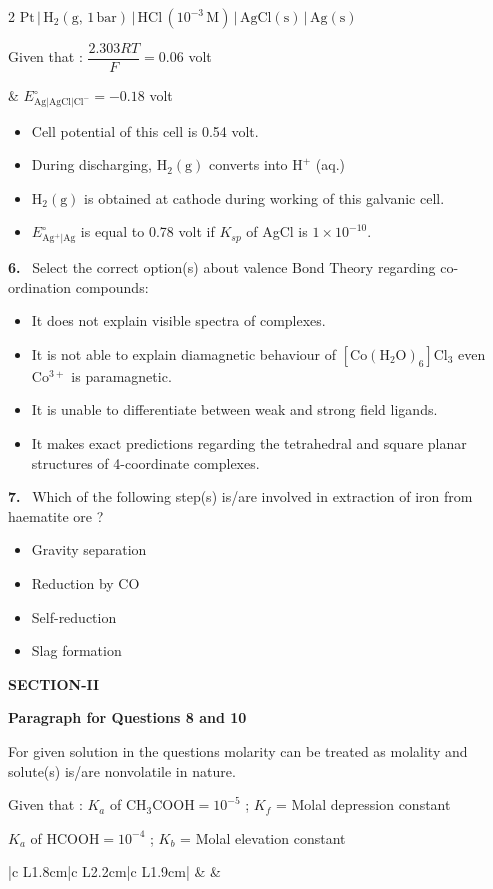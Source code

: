 \documentclass[10pt]{extarticle}
\newcommand{\sect}[1]{\par\smallskip\noindent\textbf{#1}\par}
\newcommand{\qn}[1]{\par\smallskip\noindent\textbf{#1.}~}
\newcommand{\paraq}[2]{\par\smallskip\noindent\textbf{Paragraph for Questions #1 and #2}\par}
\newenvironment{qoptions}{\begin{itemize}[leftmargin=1.8em,itemsep=1pt,topsep=2pt,label={}]}{\end{itemize}}
\newcommand{\opt}[2]{\item[(#1)] #2}
\begin{document}
\begin{multicols}{2}
$\mathrm{Pt\,|\,H_2(g,\,1\,bar)\,|\,HCl\,(10^{-3}\,M)\,|\,AgCl(s)\,|\,Ag(s)}$\par
Given that : $\dfrac{2.303RT}{F}=0.06$ volt\par
\& $E^\circ_{\mathrm{Ag|AgCl|Cl^-}}=-0.18$ volt
\begin{qoptions}
\opt{A}{Cell potential of this cell is 0.54 volt.}
\opt{B}{During discharging, $\mathrm{H_2(g)}$ converts into $\mathrm{H^+}$ (aq.)}
\opt{C}{$\mathrm{H_2(g)}$ is obtained at cathode during working of this galvanic cell.}
\opt{D}{$E^\circ_{\mathrm{Ag^+|Ag}}$ is equal to 0.78 volt if $K_{sp}$ of AgCl is $1\times10^{-10}$.}
\end{qoptions}
\qn{6} Select the correct option(s) about valence Bond Theory regarding co-ordination compounds:
\begin{qoptions}
\opt{A}{It does not explain visible spectra of complexes.}
\opt{B}{It is not able to explain diamagnetic behaviour of $\mathrm{[Co(H_2O)_6]Cl_3}$ even $\mathrm{Co^{3+}}$ is paramagnetic.}
\opt{C}{It is unable to differentiate between weak and strong field ligands.}
\opt{D}{It makes exact predictions regarding the tetrahedral and square planar structures of 4-coordinate complexes.}
\end{qoptions}
\qn{7} Which of the following step(s) is/are involved in extraction of iron from haematite ore ?
\begin{qoptions}
\opt{A}{Gravity separation}
\opt{B}{Reduction by CO}
\opt{C}{Self-reduction}
\opt{D}{Slag formation}
\end{qoptions}
\sect{SECTION-II}
\paraq{8}{10}
For given solution in the questions molarity can be treated as molality and solute(s) is/are nonvolatile in nature.\par
Given that : $K_a$ of $\mathrm{CH_3COOH}=10^{-5}$ ; $K_f$ = Molal depression constant\par
\hphantom{Given that : }$K_a$ of $\mathrm{HCOOH}=10^{-4}$ ; $K_b$ = Molal elevation constant\par
{\footnotesize\setlength{\tabcolsep}{2pt}\begin{tabular}{|c L{1.8cm}|c L{2.2cm}|c L{1.9cm}|}
\hline
{} &  & \\

\end{tabular}}
\end{multicols}
\end{document}
